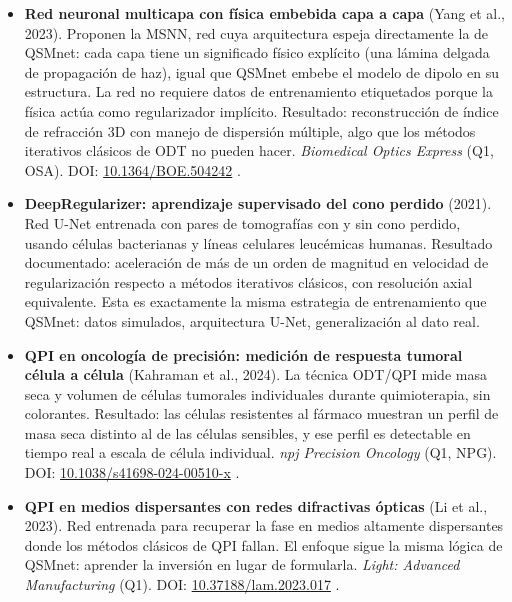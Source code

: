 \documentclass[12pt, a4paper]{article}
\begin{document}
\begin{itemize}[leftmargin=2em, itemsep=5pt]

  \item \textbf{Red neuronal multicapa con física embebida capa a capa} (Yang et al., 2023). Proponen la MSNN, red cuya arquitectura espeja directamente la de QSMnet: cada capa tiene un significado físico explícito (una lámina delgada de propagación de haz), igual que QSMnet embebe el modelo de dipolo en su estructura. La red no requiere datos de entrenamiento etiquetados porque la física actúa como regularizador implícito. Resultado: reconstrucción de índice de refracción 3D con manejo de dispersión múltiple, algo que los métodos iterativos clásicos de ODT no pueden hacer. \emph{Biomedical Optics Express} (Q1, OSA). DOI: \href{https://doi.org/10.1364/BOE.504242}{10.1364/BOE.504242} \cite{MSNN2023}.

  \item \textbf{DeepRegularizer: aprendizaje supervisado del cono perdido} (2021). Red U-Net entrenada con pares de tomografías con y sin cono perdido, usando células bacterianas y líneas celulares leucémicas humanas. Resultado documentado: aceleración de más de un orden de magnitud en velocidad de regularización respecto a métodos iterativos clásicos, con resolución axial equivalente. Esta es exactamente la misma estrategia de entrenamiento que QSMnet: datos simulados, arquitectura U-Net, generalización al dato real.

  \item \textbf{QPI en oncología de precisión: medición de respuesta tumoral célula a célula} (Kahraman et al., 2024). La técnica ODT/QPI mide masa seca y volumen de células tumorales individuales durante quimioterapia, sin colorantes. Resultado: las células resistentes al fármaco muestran un perfil de masa seca distinto al de las células sensibles, y ese perfil es detectable en tiempo real a escala de célula individual. \emph{npj Precision Oncology} (Q1, NPG). DOI: \href{https://doi.org/10.1038/s41698-024-00510-x}{10.1038/s41698-024-00510-x} \cite{Kahraman2024QPI}.

  \item \textbf{QPI en medios dispersantes con redes difractivas ópticas} (Li et al., 2023). Red entrenada para recuperar la fase en medios altamente dispersantes donde los métodos clásicos de QPI fallan. El enfoque sigue la misma lógica de QSMnet: aprender la inversión en lugar de formularla. \emph{Light: Advanced Manufacturing} (Q1). DOI: \href{https://doi.org/10.37188/lam.2023.017}{10.37188/lam.2023.017} \cite{Ozcan2023QPI}.

\end{itemize}
\end{document}

